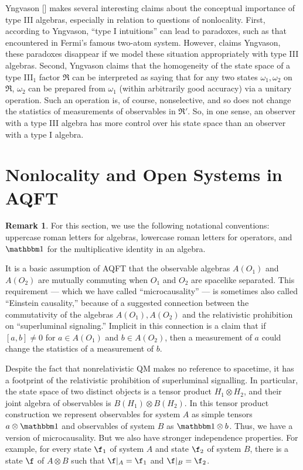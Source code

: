 \documentclass[12pt]{article}
\theoremstyle{definition}
\theoremstyle{definition}
\newtheorem{note}[thm]{Remark}
\theoremstyle{remark}
\def\8#1{{\mathbbm #1}}
\def\al#1{{\mathfrak #1}}
\def\om{\omega} \def\Om{\Omega} \def\dd{\partial} \def\D{\Delta}
\begin{document}
Yngvason [\citeyear{yng}] makes several interesting claims about the
conceptual importance of type III algebras, especially in relation to
questions of nonlocality.  First, according to Yngvason, ``type I
intuitions'' can lead to paradoxes, such as that encountered in
Fermi's famous two-atom system.  However, claims Yngvason, these
paradoxes disappear if we model these situation appropriately with
type III algebras.  Second, Yngvason claims that the homogeneity of
the state space of a type III$_1$ factor $\al R$ can be interpreted as
saying that for any two states $\om _1,\om _2$ on $\al R$, $\om _2$
can be prepared from $\om _1$ (within arbitrarily good accuracy) via a
unitary operation.  Such an operation is, of course, nonselective, and
so does not change the statistics of measurements of observables in
$\al R'$.  So, in one sense, an observer with a type III algebra has
more control over his state space than an observer with a type I
algebra.


\section{Nonlocality and Open Systems in AQFT}  \label{summers}

\begin{note} For this section, we use the following notational
  conventions: uppercase roman letters for algebras, lowercase roman
  letters for operators, and $\81$ for the multiplicative identity in
  an algebra. \end{note}

It is a basic assumption of AQFT that the observable algebras $A(O_1)$
and $A(O_2)$ are mutually commuting when $O_1$ and $O_2$ are spacelike
separated.  This requirement --- which we have called
``microcausality'' --- is sometimes also called ``Einstein
causality,'' because of a suggested connection between the
commutativity of the algebras $A(O_1),A(O_2)$ and the relativistic
prohibition on ``superluminal signaling.''  Implicit in this
connection is a claim that if $[a,b]\neq 0$ for $a\in A(O_1)$ and
$b\in A(O_2)$, then a measurement of $a$ could change the statistics
of a measurement of $b$.

Despite the fact that nonrelativistic QM makes no reference to
spacetime, it has a footprint of the relativistic prohibition of
superluminal signalling.  In particular, the state space of two
distinct objects is a tensor product $H_1\otimes H_2$, and their joint
algebra of observables is $B(H_1)\otimes B(H_2)$.  In this tensor
product construction we represent observables for system $A$ as simple
tensors $a\otimes \81$ and observables of system $B$ as $\81 \otimes
b$.  Thus, we have a version of microcausality.  But we also have
stronger independence properties.  For example, for every state $\f
_1$ of system $A$ and state $\f _2$ of system $B$, there is a state
$\f$ of $A\otimes B$ such that $\f |_{A}=\f _1$ and $\f |_B = \f _2$.
\end{document}
